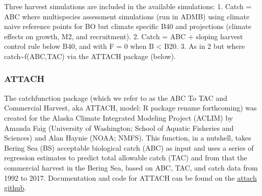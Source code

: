 \documentclass[]{article}
\begin{document}
Three harvest simulations are included in the available simulations: 1.
Catch = ABC where multispecies assessment simulations (run in ADMB)
using climate naive reference points for BO but climate specific B40 and
projections (climate effects on growth, M2, and recruitment). 2. Catch =
ABC + sloping harvest control rule below B40, and with F = 0 when B
\textless{} B20. 3. As in 2 but where catch\textasciitilde{}f(ABC,TAC)
via the ATTACH package (below).

\subsubsection{ATTACH}\label{attach}

The catchfunction package (which we refer to as the ABC To TAC and
Commercial Harvest, aka ATTACH, model: R package rename forthcoming) was
created for the Alaska Climate Integrated Modeling Project (ACLIM) by
Amanda Faig (University of Washington; School of Aquatic Fisheries and
Sciences) and Alan Haynie (NOAA; NMFS). This function, in a nutshell,
takes Bering Sea (BS) acceptable biological catch (ABC) as input and
uses a series of regression estimates to predict total allowable catch
(TAC) and from that the commercial harvest in the Bering Sea, based on
ABC, TAC, and catch data from 1992 to 2017. Documentation and code for
ATTACH can be found on the
\href{\%22https://github.com/amandafaig/catchfunction\%22}{attach
github}.
\end{document}
